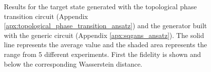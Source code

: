 \begin{figure}[htbp!]

  \caption{
    Results for the target state generated with the topological phase
    transition circuit (Appendix \ref{apx:topological_phase_transition_ansatz})
    and the generator built with the generic circuit (Appendix \ref{apx:sqgans_ansatz}).
    The solid line represents the average value and the shaded area
    represents the range from 5 different experiments. First the
    fidelity is shown and below the corresponding Wasserstein distance.}
  \label{fig:wqgans_phase_res_5}
\end{figure}
